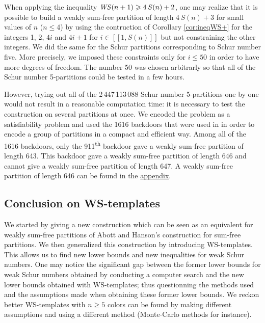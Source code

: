 When applying the inequality \(\mathit{WS}(n+1) \geqslant 4 \, S(n) + 2\), one may realize that it is possible to build a weakly 
sum-free partition of length \(4 \, S(n) + 3\) for small values of \(n\) (\(n \leqslant 4\)) by using the contruction of 
Corollary \ref{cor:ineqWS+} for the integers 1, 2, \(4i\) and \(4i+1\) for \(i \in [\![1, S(n)]\!]\) but not 
constraining the other integers. We did the same for the Schur partitions corresponding to Schur number five. More precisely, 
we imposed these constraints only for \(i \leqslant 50\) in order to have more degrees of freedom. The number 50 was chosen 
arbitrarly so that all of the Schur number 5-partitions could be tested in a few hours.

However, trying out all of the 2\,447\,113\,088 Schur number 5-partitions \cite{Heule2017} one by one would not result in a 
reasonable computation time: it is necessary to test the construction on several partitions at once. We encoded the problem as a 
satisfiability problem and used the 1616 backdoors that were used in \cite{Heule2017} in order to encode a group of partitions in 
a compact and efficient way. Among all of the 1616 backdoors, only the 911\textsuperscript{th} backdoor gave a weakly sum-free 
partition of length 643. This backdoor gave a weakly sum-free partition of length 646 and cannot give a weakly sum-free 
partition of length 647. A weakly sum-free partition of length 646 can be found in the \hyperref[WS(6)]{appendix}.


\subsection{Conclusion on WS-templates}

We started by giving a new construction which can be seen as an equivalent for weakly sum-free partitions of Abott
and Hanson's construction for sum-free partitions. We then generalized this construction by introducing WS-templates. This
allows us to find new lower bounds and new inequalities for weak Schur numbers. One may notice the significant gap
between the former lower bounds for weak Schur numbers obtained by conducting a computer search and the new lower bounds
obtained with WS-templates; thus questionning the methods used and the assumptions made when obtaining these former lower 
bounds. We reckon better WS-templates with \(n \geqslant 5\) colors can be found by making different assumptions 
and using a different method (Monte-Carlo methods for instance).

